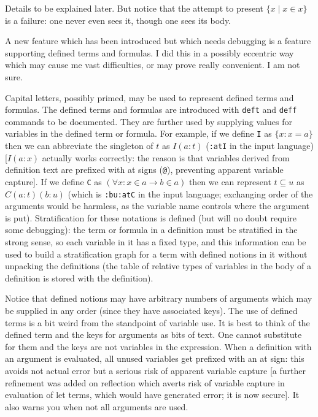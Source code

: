 \documentclass[12pt]{article}
\begin{document}
Details to be explained later. But notice that the attempt to
present \newline $\{x \mid x \in x\}$ is a failure: one never even sees
it, though one sees its body.

A new feature which has been introduced but which needs debugging is a feature supporting defined terms and formulas.
I did this in a possibly eccentric way which may cause me vast difficulties, or may prove really convenient.  I am not sure.

Capital letters, possibly primed, may be used to represent defined terms and formulas.  The defined terms and formulas
are introduced with {\tt deft} and {\tt deff} commands to be documented.  They are further used by supplying values for variables
in the defined term or formula.  For example, if we define {\tt I} as $\{x:x=a\}$ then we can abbreviate the singleton of $t$ as
$I(a:t)$ ({\tt :atI} in the input language) [$I(a:x)$ actually works correctly:  the reason is that variables derived from definition text are prefixed with at signs ({\tt @}), preventing apparent variable capture].  If we define {\tt C} as $(\forall x:x \in a \rightarrow b \in a)$ then we can represent $t \subseteq u$
as $C(a:t)(b:u)$ (which is {\tt :bu:atC} in the input language;  exchanging order of the arguments would be harmless, as the variable
name controls where the argument is put).   Stratification for these notations is defined (but will no doubt require some debugging):  the term
or formula in a definition must be stratified in the strong sense, so each variable in it has a fixed type, and this information can be used
to build a stratification graph for a term with defined notions in it without unpacking the definitions (the table of relative types of variables in the body of a definition is stored with the definition).

Notice that defined notions may have arbitrary numbers of arguments which may be supplied in any order (since they have associated keys).
The use of defined terms is a bit weird from the standpoint of variable use.  It is best to think of the defined term and the keys for arguments
as bits of text.  One cannot substitute for them and the keys are not variables in the expression.  When a definition with an argument is evaluated,
all unused variables get prefixed with an at sign:  this avoids not actual error but a serious risk of apparent variable capture [a further refinement was added on reflection which averts risk of variable capture in evaluation of let terms, which would have generated error;  it is now secure].  It also warns you when
not all arguments are used.
\end{document}
